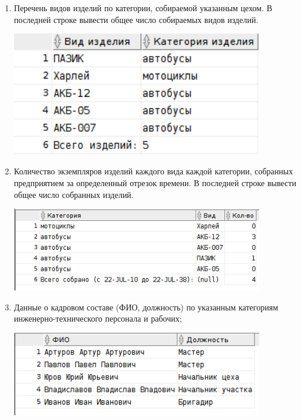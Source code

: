 \begin{enumerate}

    \item Перечень видов изделий по категории, собираемой указанным цехом.
    В последней строке вывести общее число собираемых видов изделий.

    

    \includegraphics[width=11cm]{./screenshots/results/result1.png}

    \item Количество экземпляров изделий каждого вида каждой категории, собранных предприятием за определенный отрезок времени.
    В последней строке вывести общее число собранных изделий.

    

    \includegraphics[width=11cm]{./screenshots/results/result2.png}

    \item Данные о кадровом составе (ФИО, должность) по указанным категориям инженерно-технического персонала и рабочих;

    

    \includegraphics[width=11cm]{./screenshots/results/result3.png}


\end{enumerate}
